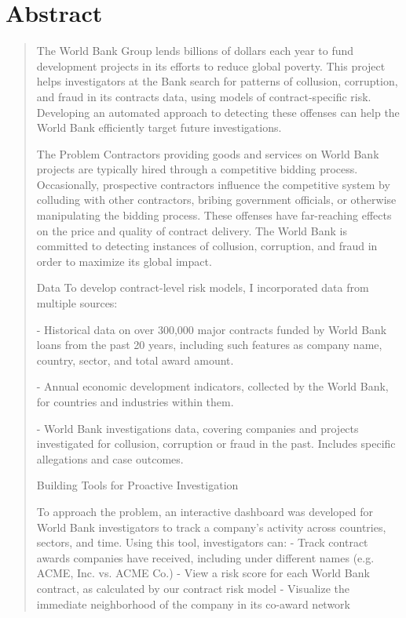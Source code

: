 \section*{\centering  \normalsize{Abstract} }
\begin{quotation}
\small
\noindent 
The World Bank Group lends billions of dollars each year to fund development projects in its efforts to reduce global poverty. This project helps investigators at the Bank search for patterns of collusion, corruption, and fraud in its contracts data, using models of contract-specific risk. Developing an automated approach to detecting these offenses can help the World Bank efficiently target future investigations.


 The Problem
Contractors providing goods and services on World Bank projects are typically hired through a competitive bidding process. Occasionally, prospective contractors influence the competitive system by colluding with other contractors, bribing government officials, or otherwise manipulating the bidding process. These offenses have far-reaching effects on the price and quality of contract delivery. The World Bank is committed to detecting instances of collusion, corruption, and fraud in order to maximize its global impact.

 Data
To develop contract-level risk models, I incorporated data from multiple sources:

  - Historical data on over 300,000 major contracts funded by World Bank loans from the past 20 years, including such features as company name, country, sector, and total award amount.

	- Annual economic development indicators, collected by the World Bank, for countries and industries within them.

	- World Bank investigations data, covering companies and projects investigated for collusion, corruption or fraud in the past. Includes specific allegations and case outcomes.

 Building Tools for Proactive Investigation

To approach the problem,  an interactive dashboard was developed for World Bank investigators to track a company’s activity across countries, sectors, and time. Using this tool, investigators can:
- Track contract awards companies have received, including under different names (e.g. ACME, Inc. vs. ACME Co.)
- View a risk score for each World Bank contract, as calculated by our contract risk model
- Visualize the immediate neighborhood of the company in its co-award network


\end{quotation}
